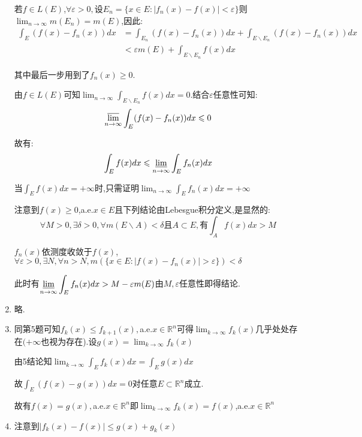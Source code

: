 \documentclass[UTF8, a4paper, 12pt, oneside, onecolumn]{article}
\numberwithin{equation}{section}
\numberwithin{figure}{section}
\numberwithin{table}{section}
\theoremstyle{nonumberplain}	%
\theoremstyle{plain}	%
\theoremstyle{plain}	%
\theoremstyle{plain}	%
\theoremstyle{plain}	%
\theoremstyle{nonumberplain}
\begin{document}
\begin{enumerate}
	若$f\in L(E)$,$\forall \varepsilon>0,$设$E_n=\{x\in E:|f_n(x)-f(x)|<\varepsilon \}$则$\displaystyle\lim_{n\rightarrow \infty}m(E_n)=m(E)$,因此:
	\begin{align*}
		\int_E(f(x)-f_n(x))dx&=\int_{E_n}(f(x)-f_n(x))dx+\int_{E\backslash E_n}(f(x)-f_n(x))dx\\
		&<\varepsilon m(E)+\int_{E\backslash E_n}f(x)dx
	\end{align*}
	
	其中最后一步用到了$f_n(x)\geqslant 0$.
	
	由$f\in L(E)$可知$\displaystyle\lim_{n\rightarrow \infty}\int_{E\backslash E_n}f(x)dx=0$.结合$\varepsilon$任意性可知:
	$$\varlimsup_{n\rightarrow \infty}\int_{E}(f(x)-f_n(x))dx\leqslant 0$$
	
	故有:$$\int_{E}f(x)dx\leqslant\varliminf_{n\rightarrow \infty}\int_{E}f_n(x)dx$$
	
	当$\displaystyle\int_{E}f(x)dx=+\infty$时,只需证明$\displaystyle\lim_{n\rightarrow \infty}\int_Ef_n(x)dx=+\infty$
	
	注意到$f(x)\geqslant0$,a.e.$x\in E$且下列结论由Lebesgue积分定义,是显然的:
	$$\displaystyle\forall M>0,\exists \delta>0,\forall m(E\backslash A)<\delta \text{且} A\subset E ,\text{有} \int_Af(x)dx>M$$
	
	$f_n(x)$依测度收敛于$f(x)$,$\forall \varepsilon>0,\exists N,\forall n>N,m(\{x\in E:|f(x)-f_n(x)|>\varepsilon\})<\delta$
	
	此时有$\displaystyle\varliminf_{n\rightarrow\infty}\int_Ef_n(x)dx>M-\varepsilon m(E)$由$M,\varepsilon$任意性即得结论.	
	
	
	
	
	\item 略.
	
	\item 同第5题可知$f_k(x)\leqslant f_{k+1}(x),$a.e.$x\in\mathbb{R}^n$可得$\displaystyle\lim_{k\rightarrow \infty}f_k(x)$几乎处处存在$(+\infty$也视为存在).设$\displaystyle g(x)=\lim_{k\rightarrow \infty}f_k(x)$
	
	由5结论知$\displaystyle\lim_{k\rightarrow \infty}\int_Ef_k(x)dx=\int_Eg(x)dx$
	
	故$\displaystyle\int_E (f(x)-g(x))dx=0$对任意$E\subset \mathbb{R}^n$成立.
	
	故有$f(x)=g(x),$a.e.$x\in\mathbb{R}^n $即$\displaystyle \lim_{k\rightarrow \infty}f_k(x)=f(x)$,a.e.$x\in\mathbb{R}^n $
	
	
	\item 注意到$|f_k(x)-f(x)|\leqslant g(x)+g_k(x)$
	

\end{enumerate}
\end{document}

